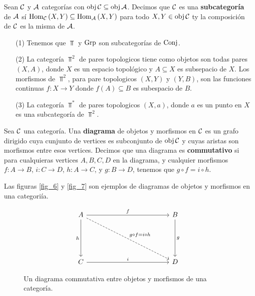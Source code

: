 \begin{definition}
    Sean $\mathcal{C}$ y  $\mathcal{A}$ categor\'ias con  $\operatorname{obj}{\mathcal{C}} \subseteq \operatorname{obj}{\mathcal{A}}$.
    Decimos que $\mathcal{C}$ es una \textbf{subcategor\'ia} de $\mathcal{A}$ s\'i
    $\operatorname{Hom}_{\mathcal{C}}{(X,Y)} \subseteq \operatorname{Hom}_{\mathcal{A}}{(X,Y)}$ para todo $X,Y \in \operatorname{obj}{\mathcal{C}}$ ty
    la composici\'on de $\mathcal{C}$ es la misma de  $\mathcal{A}$.
\end{definition}

\begin{example}\label{}
    \begin{enumerate}
        \item[(1)] Tenemos que $\Top$ y  $\operatorname{Grp}$ son subcategor\'ias de
            $\operatorname{Conj}$.
        \item[(2)] La categor\'ia $\Top^2$ de pares topologicos tiene como objetos
            son todas pares  $(X,A)$, donde $X$ es un espacio topol\'ogico y $A
            \subseteq X$ es subsepacio de $X$. Los morfismos de $\Top^2$, para
            pare topologicos  $(X,Y)$ y $(Y,B)$, son las funciones continuas
            $f:X \xrightarrow{} Y$ donde $f(A) \subseteq B$ es subespacio de $B$.

        \item[(3)] La categor\'ia $\Top^*$ de pares topologicos  $(X,a)$, donde
            $a$ es un punto en  $X$ es una subcategor\'ia de  $\Top^2$.
    \end{enumerate}
\end{example}

\begin{definition}
    Sea $\mathcal{C}$ una categor\'ia. Una \textbf{diagrama} de objetos y morfismos en
    $\mathcal{C}$ es un grafo dirigido cuya cunjunto de vertices es subconjunto de
    $\operatorname{obj}{\mathcal{C}}$ y cuyas aristas son morfismos entre esos vertices. Decimos que
    una diagrama es \textbf{commutativo} si para cualquieras vertices $A,B,C,D$
    en la diagrama, y cualquier morfismos  $f:A \xrightarrow{} B$, $i:C
    \xrightarrow{} D$, $h:A \xrightarrow{} C$, y $g:B \xrightarrow{} D$, tenemos
    que $g \circ f=i \circ h$.
\end{definition}

\begin{example}\label{}
    Las figuras \ref{fig_6} y \ref{fig_7} son ejemplos de diagramas de objetos y
    morfismos en una categori\'ia.
\end{example}

\begin{figure}[h]
    \centering
    \[\begin{tikzcd}
	A &&&&& B \\
	\\
	\\
	C &&&&& D
	\arrow["f", from=1-1, to=1-6]
	\arrow["i", from=4-1, to=4-6]
	\arrow["g", from=1-6, to=4-6]
	\arrow["h"', from=1-1, to=4-1]
	\arrow["{g \circ f=i \circ h}", dashed, from=1-1, to=4-6]
\end{tikzcd}\]
    \caption{Un diagrama commutativa entre objetos y morfismos de una
    categor\'ia.}
    \label{fig_8}
\end{figure}
